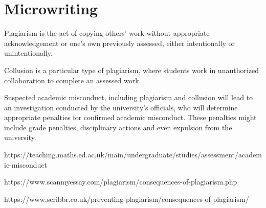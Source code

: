 \documentclass[a4paper,11pt]{article}
\begin{document}
\section{Microwriting}

Plagiarism is the act of copying others' work without appropriate acknowledgement or one's own previously assessed, either intentionally or unintentionally.\cite{1}

Collusion is a particular type of plagiarism, where students work in unauthorized collaboration to complete an assessed work.\cite{1}

Suspected academic misconduct, including plagiarism and collusion will lead to an investigation conducted by the university's officials, who will determine appropriate penalties for confirmed academic misconduct. These penalties might include grade penalties, disciplinary actions and even expulsion from the university.\cite{2,3}

\begin{thebibliography}{99}

	 https://teaching.maths.ed.ac.uk/main/undergraduate/studies/assessment/academic-misconduct
	
	https://www.scanmyessay.com/plagiarism/consequences-of-plagiarism.php
	
	https://www.scribbr.co.uk/preventing-plagiarism/consequences-of-plagiarism/
\end{thebibliography}
\end{document}
